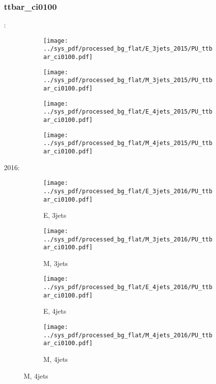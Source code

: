 \documentclass{beamer}
\begin{document}
\begin{frame}
\frametitle{ttbar_ci0100}
\fontsize{5}{1}:
\begin{figure}
\centering
\begin{subfigure}[b]{0.24\textwidth}
\texttt{[image: ../sys\_pdf/processed\_bg\_flat/E\_3jets\_2015/PU\_ttbar\_ci0100.pdf]}
\end{subfigure}
\begin{subfigure}[b]{0.24\textwidth}
\texttt{[image: ../sys\_pdf/processed\_bg\_flat/M\_3jets\_2015/PU\_ttbar\_ci0100.pdf]}
\end{subfigure}
\begin{subfigure}[b]{0.24\textwidth}
\texttt{[image: ../sys\_pdf/processed\_bg\_flat/E\_4jets\_2015/PU\_ttbar\_ci0100.pdf]}
\end{subfigure}
\begin{subfigure}[b]{0.24\textwidth}
\texttt{[image: ../sys\_pdf/processed\_bg\_flat/M\_4jets\_2015/PU\_ttbar\_ci0100.pdf]}
\end{subfigure}
\end{figure}
2016:
\begin{figure}
\centering
\begin{subfigure}[b]{0.24\textwidth}
\texttt{[image: ../sys\_pdf/processed\_bg\_flat/E\_3jets\_2016/PU\_ttbar\_ci0100.pdf]}
\captionsetup{font=tiny}
\caption{E, 3jets}
\end{subfigure}
\begin{subfigure}[b]{0.24\textwidth}
\texttt{[image: ../sys\_pdf/processed\_bg\_flat/M\_3jets\_2016/PU\_ttbar\_ci0100.pdf]}
\captionsetup{font=tiny}
\caption{M, 3jets}
\end{subfigure}
\begin{subfigure}[b]{0.24\textwidth}
\texttt{[image: ../sys\_pdf/processed\_bg\_flat/E\_4jets\_2016/PU\_ttbar\_ci0100.pdf]}
\captionsetup{font=tiny}
\caption{E, 4jets}
\end{subfigure}
\begin{subfigure}[b]{0.24\textwidth}
\texttt{[image: ../sys\_pdf/processed\_bg\_flat/M\_4jets\_2016/PU\_ttbar\_ci0100.pdf]}
\captionsetup{font=tiny}
\caption{M, 4jets}
\end{subfigure}
\end{figure}
\end{frame}
\end{document}
